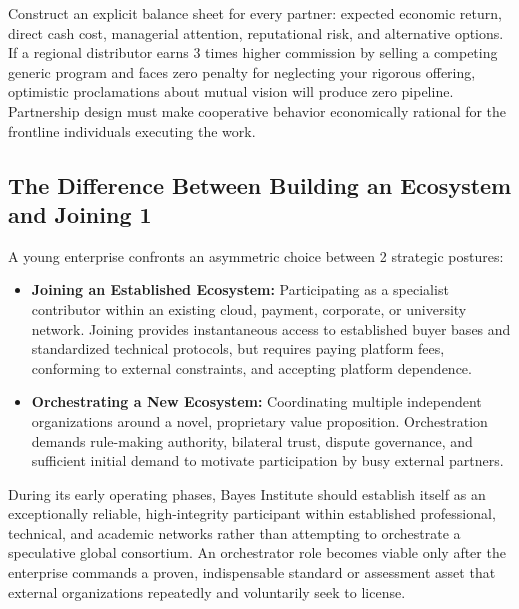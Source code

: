 Construct an explicit balance sheet for every partner: expected economic return, direct cash cost, managerial attention, reputational risk, and alternative options. If a regional distributor earns 3 times higher commission by selling a competing generic program and faces zero penalty for neglecting your rigorous offering, optimistic proclamations about mutual vision will produce zero pipeline. Partnership design must make cooperative behavior economically rational for the frontline individuals executing the work.

\subsection{The Difference Between Building an Ecosystem and Joining 1}
\label{sec:building_versus_joining_ecosystem}

A young enterprise confronts an asymmetric choice between 2 strategic postures:
\begin{itemize}
\item \textbf{Joining an Established Ecosystem:} Participating as a specialist contributor within an existing cloud, payment, corporate, or university network. Joining provides instantaneous access to established buyer bases and standardized technical protocols, but requires paying platform fees, conforming to external constraints, and accepting platform dependence.
\item \textbf{Orchestrating a New Ecosystem:} Coordinating multiple independent organizations around a novel, proprietary value proposition. Orchestration demands rule-making authority, bilateral trust, dispute governance, and sufficient initial demand to motivate participation by busy external partners.
\end{itemize}

During its early operating phases, Bayes Institute should establish itself as an exceptionally reliable, high-integrity participant within established professional, technical, and academic networks rather than attempting to orchestrate a speculative global consortium. An orchestrator role becomes viable only after the enterprise commands a proven, indispensable standard or assessment asset that external organizations repeatedly and voluntarily seek to license.
